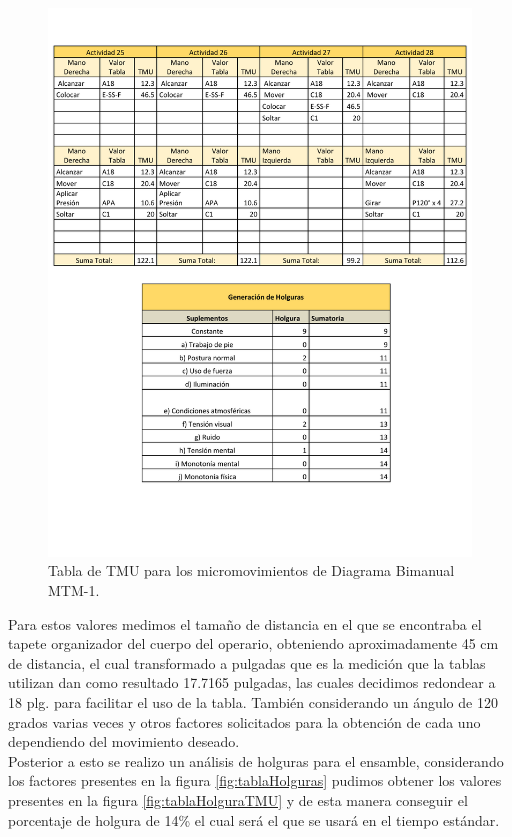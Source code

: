             \begin{figure}[H]
        \centering
        \includegraphics[trim = {1mm 140mm 1mm 10mm},clip,scale=0.35]{19/Img/tablaTMU5.pdf}
        \newpage
        \caption{Tabla de TMU para los micromovimientos de Diagrama Bimanual MTM-1.}
        \label{fig:tablaTMU5}    
    \end{figure}
Para estos valores medimos el tamaño de distancia en el que se encontraba el tapete organizador del cuerpo del operario, obteniendo aproximadamente 45 cm de distancia, el cual transformado a pulgadas que es la medición que la tablas utilizan dan como resultado 17.7165 pulgadas, las cuales decidimos redondear a 18 plg. para facilitar el uso de la tabla. También considerando un ángulo de 120 grados varias veces y otros factores solicitados para la obtención de cada uno dependiendo del movimiento deseado.
\\Posterior a esto se realizo un análisis de holguras para el ensamble, considerando los factores presentes en la figura \ref{fig:tablaHolguras} pudimos obtener los valores presentes en la figura \ref{fig:tablaHolguraTMU} y de esta manera conseguir el porcentaje de holgura de 14\% el cual será el que se usará en el tiempo estándar.
